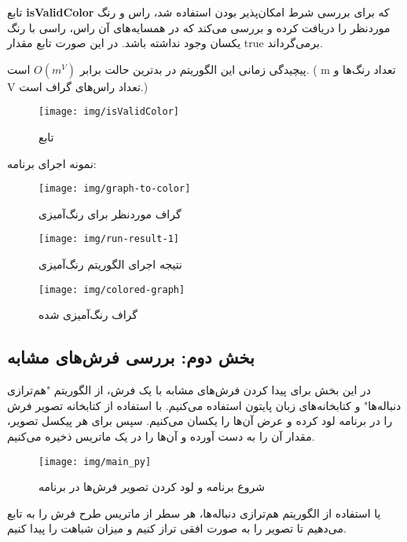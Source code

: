 \documentclass[12pt]{article}
\begin{document}
	تابع \textbf{isValidColor} که برای بررسی شرط امکان‌پذیر بودن استفاده شد، ‌راس و رنگ موردنظر را دریافت کرده و بررسی می‌کند که در همسایه‌های آن راس، راسی با رنگ یکسان وجود نداشته باشد. در این صورت تابع مقدار true برمی‌گرداند.

پیچیدگی زمانی این الگوریتم در بدترین حالت برابر
 	$O(m^V)$
   است. ( m تعداد رنگ‌ها و V تعداد راس‌های گراف است.)
	\begin{figure}[H]
		\centering
		\texttt{[image: img/isValidColor]}
		\caption{تابع }
		\label{fig:isvalidcolor}
	\end{figure}
نمونه اجرای برنامه:
	\begin{figure}[H]
		\centering
		\texttt{[image: img/graph-to-color]}
		\caption{گراف موردنظر برای رنگ‌آمیزی}
		\label{fig:graph-to-color}
	\end{figure}

	\begin{figure}[H]
		\centering
		\texttt{[image: img/run-result-1]}
		\caption{نتیجه اجرای الگوریتم رنگ‌آمیزی}
		\label{fig:run-result-1}
	\end{figure}

	\begin{figure}[H]
		\centering
		\texttt{[image: img/colored-graph]}
		\caption{گراف رنگ‌آمیزی شده}
		\label{fig:colored-graph}
	\end{figure}

	\newpage
	\subsection{بخش دوم: بررسی فرش‌های مشابه}
	در این بخش برای پیدا کردن فرش‌های مشابه با یک فرش، از الگوریتم "هم‌ترازی دنباله‌ها" و کتابخانه‌های زبان پایتون استفاده می‌کنیم. با استفاده از کتابخانه  تصویر فرش را در برنامه لود کرده و عرض آن‌ها را یکسان می‌کنیم. سپس برای هر پیکسل تصویر، مقدار  آن را به دست آورده و آن‌ها را در یک ماتریس ذخیره می‌کنیم.\\
	\begin{figure}[H]
		\centering
		\texttt{[image: img/main\_py]}
		\caption{شروع برنامه و لود کردن تصویر فرش‌ها در برنامه}
		\label{fig:mainpy}
	\end{figure}

	یا استفاده از الگوریتم هم‌ترازی دنباله‌ها، هر سطر از ماتریس طرح فرش را به تابع
	می‌دهیم تا تصویر را به صورت افقی تراز کنیم و میزان شباهت را پیدا کنیم.
\end{document}
